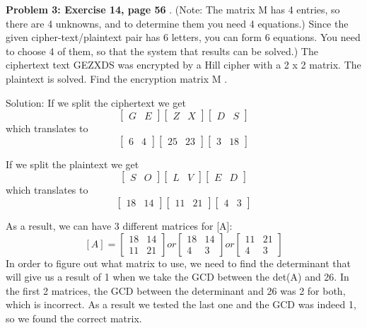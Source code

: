 \documentclass[12pt,letterpaper,final]{report}
\begin{document}
\bigskip
\noindent\textbf{Problem 3: Exercise 14, page 56} . (Note: The matrix M has 4 entries, so there are 4 unknowns, and to determine them you need 4 equations.) 
Since the given cipher-text/plaintext pair has 6 letters, you can form 6 equations. You need to choose 4 of them, so that the system that results can be solved.) The ciphertext text GEZXDS was encrypted by a Hill cipher with a 2 x 2 matrix. The plaintext is solved. Find the encryption matrix M .

\bigskip Solution: If we split the ciphertext we get \[\begin{bmatrix} G &E\end{bmatrix}\begin{bmatrix} Z &X\end{bmatrix}\begin{bmatrix} D &S\end{bmatrix} \] which translates to \[\begin{bmatrix} 6 &4\end{bmatrix}\begin{bmatrix} 25 &23\end{bmatrix}\begin{bmatrix} 3 &18\end{bmatrix} \]

\bigskip If we split the plaintext we get \[\begin{bmatrix} S &O\end{bmatrix}\begin{bmatrix} L &V\end{bmatrix}\begin{bmatrix} E &D\end{bmatrix} \] which translates to \[\begin{bmatrix} 18 &14\end{bmatrix}\begin{bmatrix} 11 &21\end{bmatrix}\begin{bmatrix} 4 &3\end{bmatrix} \] 

\bigskip As a result, we can have 3 different matrices for [A]: \[[A] =  \begin{bmatrix} 18 &14 \\ 11 &21\end{bmatrix} or \begin{bmatrix} 18 &14 \\ 4 &3\end{bmatrix} or \begin{bmatrix} 11 &21 \\ 4 &3\end{bmatrix} \]
\bigskip In order to figure out what matrix to use, we need to find the determinant that will give us a result of 1 when we take the GCD between the det(A) and 26. In the first 2 matrices, the GCD between the determinant and 26 was 2 for both, which is incorrect. As a result we tested the last one and the GCD was indeed 1, so we found the correct matrix. 
\end{document}
